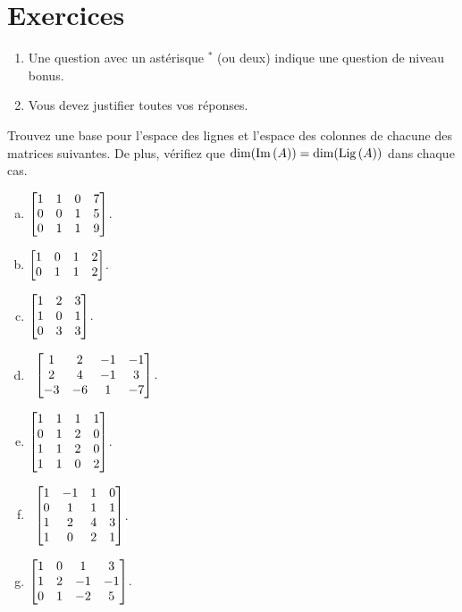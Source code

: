 
\section*{Exercices}


\begin{enumerate}
\item Une question avec un astérisque $ ^\ast$ (ou deux) indique une question de niveau bonus.
 \item Vous devez justifier toutes vos réponses.  
\end{enumerate}
\bigskip


 \begin{prob} \label{prob16.1} Trouvez une base pour l'espace des lignes et l'espace des colonnes de chacune des matrices suivantes. De plus, vérifiez que $\dim(\operatorname{Im}\,(A)) = \dim(\operatorname{Lig\,}(A))$ dans chaque cas.
\medskip
\begin{enumerate}[a)]
\item $\bmatrix 1&1&0&7\cr 0&0&1&5\cr 0&1&1&9 \endbmatrix $.
\medskip 
 
\item\sov
$\bmatrix 1&0&1&2\cr 0&1&1&2\endbmatrix $.
\medskip
 
\item $\bmatrix 1&2&3\\1&0&1\\ 0&3&3 \endbmatrix $.
\medskip
 
\item\sov~$\bmatrix 1&2&-1&-1\\2&4&-1&3\\ -3&-6&1&-7\endbmatrix$.
\medskip
 
\item $\bmatrix 1& 1& 1& 1\\ 0& 1& 2& 0\\ 1& 1& 2& 0\\ 1& 1& 0& 2 \endbmatrix$. \medskip
 
\item\sov~$\bmatrix 1 & -1 & 1 & 0 \\
 0 & 1 & 1 & 1 \\
 1 & 2 & 4 & 3 \\
 1 & 0 & 2 & 1\endbmatrix$.\medskip
 
\item $\bmatrix 1&0&1&3\\ 1&2&-1&-1\\ 0&1&-2&5\endbmatrix $.\medskip
 
\end{enumerate}


\end{prob}
